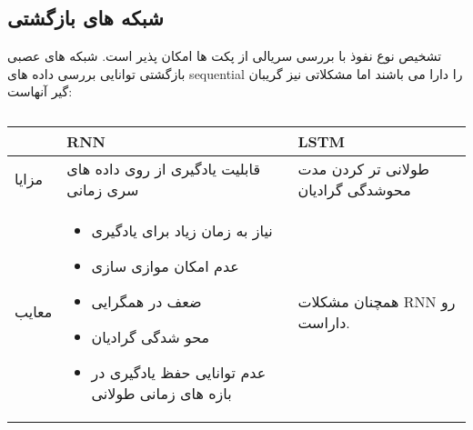 \documentclass{report}
\begin{document}
			\subsection{شبکه های بازگشتی}
			تشخیص نوع نفوذ با بررسی سریالی از پکت ها امکان پذیر است. شبکه های عصبی بازگشتی توانایی بررسی داده های sequential را دارا می باشند اما مشکلاتی نیز گریبان گیر آنهاست:
			\begin{center}
				\begin{table}[h!]
					\caption{}
					\label{tab:my_label} %
					\begin{tabular}{ |p{2cm}|p{7cm}|p{4cm}| }
						\hline
						 & RNN & LSTM \\
						\hline
						مزایا & 
						قابلیت یادگیری از روی داده های سری زمانی &
						طولانی تر کردن مدت محوشدگی گرادیان \\
						\hline
						معایب & 
						\begin{itemize}
							\item نیاز به زمان زیاد برای یادگیری
							\item عدم امکان موازی سازی
							\item ضعف در همگرایی 
							\item محو شدگی گرادیان
							\item عدم توانایی حفظ یادگیری در بازه های زمانی طولانی
						\end{itemize}
						
						&
						همچنان مشکلات RNN رو داراست. \\
						\hline
					  \end{tabular}
				\end{table}
				
				
				
				
				
				
			\end{center}
			
			  
		\lr{
			
			
		}
	
\end{document}
